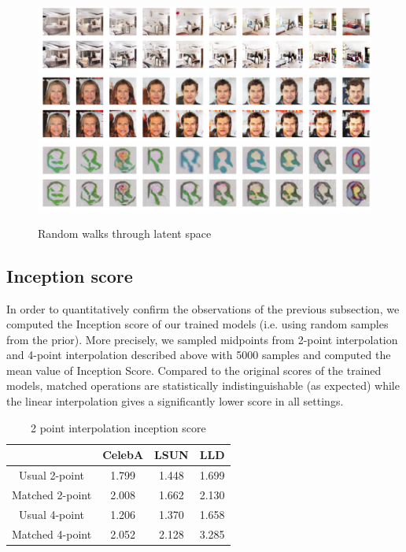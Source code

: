 \documentclass{article}
\begin{document}
\begin{center}
\begin{figure}
\includegraphics[width=\linewidth]{CelebA/images/LSUN_rw_2.png}\\
\includegraphics[width=\linewidth]{CelebA/images/Celeba_rw_2.png}\\
\includegraphics[width=\linewidth]{CelebA/images/LLD_rw_1.png}
\caption{Random walks through latent space}
\end{figure}
\end{center}

\subsection{Inception score}
In order to quantitatively confirm the observations of the previous subsection, we computed the Inception score of our trained models (i.e. using random samples from the prior). More precisely, we sampled midpoints from 2-point interpolation and 4-point interpolation described above with 5000 samples and computed the mean value of Inception Score.  Compared to the original scores of the trained models, matched operations are statistically indistinguishable (as expected) while the linear interpolation gives a significantly lower score in all settings.
\begin{table}[]
    \centering
    \begin{tabular}{|c |c |c |c |}
    \hline
    & CelebA & LSUN & LLD \\
    \hline
        Usual 2-point & 1.799 & 1.448 & 1.699\\
    \hline
        Matched 2-point & 2.008 & 1.662 & 2.130\\
    \hline
        Usual 4-point & 1.206 & 1.370 & 1.658\\
    \hline
        Matched 4-point & 2.052 & 2.128 & 3.285\\
    \hline
    \end{tabular}
    \caption{2 point interpolation inception score}
    \label{tab:my_label_2}
\end{table}
\end{document}
